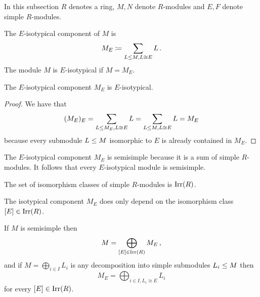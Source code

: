 \begin{conventions}
  In this subsection $R$ denotes a ring, $M, N$ denote $R$-modules and $E, F$ denote simple $R$-modules.
\end{conventions}


\begin{definition}
  The $E$-isotypical component of $M$ is
  \[
              M_E
    \coloneqq  \sum_{L \leq M, L \cong E} L \,.
  \]
  The module $M$ is $E$-isotypical if $M = M_E$.
\end{definition}


\begin{lemma}
  The $E$-isotypical component $M_E$ is $E$-isotypical.
\end{lemma}


\begin{proof}
  We have that
  \[
      (M_E)_E
    = \sum_{L \leq M_E, L \cong E} L
    = \sum_{L \leq M, L \cong E} L
    = M_E
  \]
  because every submodule $L \leq M$ isomorphic to $E$ is already contained in $M_E$.
\end{proof}


\begin{remark}
  The $E$-isotypical component $M_E$ is semisimple because it is a sum of simple $R$-modules.
  It follows that every $E$-isotypical module is semisimple.
\end{remark}


\begin{definition}
  The set of isomorphism classes of simple $R$-modules is $\operatorname{Irr}(R)$.
\end{definition}


\begin{remark}
  The isotypical component $M_E$ does only depend on the isomorphism class $[E] \in \operatorname{Irr}(R)$.
\end{remark}


\begin{theorem}
  \label{theorem: isotypical decomposition}
  If $M$ is semisimple then
  \[
      M
    = \bigoplus_{[E] \in \operatorname{Irr}(R)} M_E \,,
  \]
  and if $M = \bigoplus_{i \in I} L_i$ is any decomposition into simple submodules $L_i \leq M$ then
  \[
      M_E
    = \bigoplus_{i \in I, L_i \cong E} L_i
  \]
  for every $[E] \in \operatorname{Irr}(R)$.
\end{theorem}


